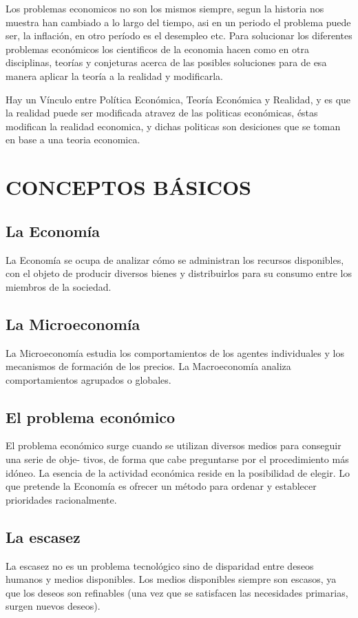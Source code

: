 \documentclass[12pt]{book}
\begin{document}
Los problemas economicos no son los mismos siempre, segun la historia nos muestra han cambiado a lo largo del tiempo, asi en un periodo el problema puede ser, la inflaci\'on, en otro per\'iodo es el desempleo etc.
Para solucionar los diferentes problemas econ\'omicos los cientificos de la economia hacen como en otra disciplinas, teor\'ias y conjeturas acerca de las posibles soluciones para de esa manera aplicar la teor\'ia a la realidad y modificarla.

Hay un Vínculo entre Política Económica, Teoría Económica y Realidad, y es que la realidad puede ser modificada atravez de las politicas econ\'omicas, \'estas modifican la realidad economica, y dichas politicas son desiciones que se toman en base a una teoria economica.

\chapter{CONCEPTOS BÁSICOS}
\section{La Economía}
La Economía se ocupa de analizar cómo se administran los recursos disponibles, con el objeto de producir diversos bienes y distribuirlos para su consumo entre los miembros de la sociedad.
\section{La Microeconomía}La Microeconomía estudia los comportamientos de los agentes individuales y los mecanismos de
formación de los precios. La Macroeconomía analiza comportamientos agrupados o globales.


\section{El problema económico}El problema económico surge cuando se utilizan diversos medios para conseguir una serie de obje-
tivos, de forma que cabe preguntarse por el procedimiento más idóneo. La esencia de la actividad económica reside en la posibilidad de elegir. Lo que pretende la Economía es ofrecer un método para ordenar y establecer prioridades racionalmente.

\section{La escasez}La escasez no es un problema tecnológico sino de disparidad entre deseos humanos y medios disponibles. Los medios disponibles siempre son escasos, ya que los deseos son refinables (una vez que se satisfacen las necesidades primarias, surgen nuevos deseos).
\end{document}
